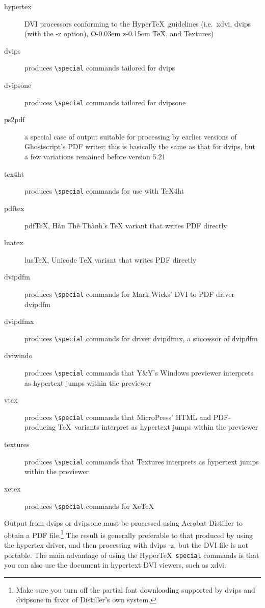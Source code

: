 \documentclass[pdftex]{article}
\def\OzTeX{O\kern-0.03em z\kern-0.15em \TeX}
\newcommand{\bs}{\symbol{'134}}%
\newcommand{\ci}[1]{\texttt{\bs#1}}
\def\Hanh{H\`an Th\^e\llap{\raise 0.5ex\hbox{\'{}}} Th\`anh}
\begin{document}
\begin{description}
\item[hypertex] DVI processors conforming to the Hyper\TeX\ guidelines (i.e.\ \textsf{xdvi}, \textsf{dvips} (with
the \textsf{-z} option), \textsf{\OzTeX}, and \textsf{Textures})
\item[dvips] produces \verb|\special| commands tailored for \textsf{dvips}
\item[dvipsone] produces \verb|\special| commands tailored for \textsf{dvipsone}
\item[ps2pdf] a special case of output suitable for processing by earlier versions of Ghost\-script's
PDF writer; this is basically the same as that for \textsf{dvips}, but a few variations remained before version 5.21
\item[tex4ht] produces \verb|\special| commands for use with \textsf{\TeX4ht}
\item[pdftex] pdf\TeX, \Hanh{}'s \TeX{} variant that writes PDF directly
\item[luatex] lua\TeX, Unicode \TeX{} variant that writes PDF directly
\item[dvipdfm] produces \verb|\special| commands for Mark Wicks' DVI to PDF driver \textsf{dvipdfm}
\item[dvipdfmx] produces \verb|\special| commands for driver
     \textsf{dvipdfmx}, a successor of \textsf{dvipdfm}
\item[dviwindo] produces \verb|\special| commands that Y\&Y's Windows previewer interprets as hypertext jumps within the previewer
\item[vtex] produces \verb|\special| commands that MicroPress' HTML and
     PDF-producing \TeX\ variants interpret as hypertext jumps within the
     previewer
\item[textures] produces \verb|\special| commands that \textsf{Textures} interprets as hypertext jumps within the previewer
\item[xetex] produces \verb|\special| commands for Xe\TeX{}
\end{description}

Output from \textsf{dvips} or \textsf{dvipsone} must be processed using
Acrobat Distiller to obtain a PDF file.\footnote{Make sure you turn off
the partial font downloading supported by \textsf{dvips} and
\textsf{dvipsone} in favor of Distiller's own system.} The result is
generally preferable to that produced by using the \textsf{hypertex}
driver, and then processing with \textsf{dvips -z}, but the DVI file is
not portable. The main advantage of using the Hyper\TeX\ \ci{special}
commands is that you can also use the document in hypertext DVI viewers,
such as \textsf{xdvi}.
\end{document}
